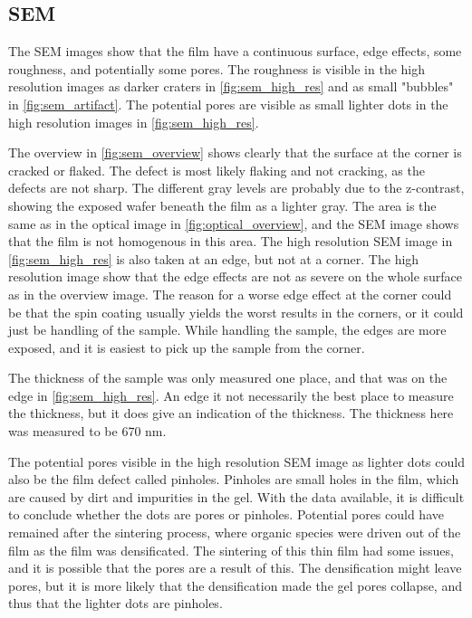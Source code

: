 \subsection{SEM}

\noindent The SEM images show that the film have a continuous surface, edge effects, some roughness, and potentially some pores.
The roughness is visible in the high resolution images as darker craters in \autoref{fig:sem_high_res} and as small "bubbles" in \autoref{fig:sem_artifact}.
The potential pores are visible as small lighter dots in the high resolution images in \autoref{fig:sem_high_res}.

The overview in \autoref{fig:sem_overview} shows clearly that the surface at the corner is cracked or flaked.
The defect is most likely flaking and not cracking, as the defects are not sharp.
The different gray levels are probably due to the z-contrast, showing the exposed wafer beneath the film as a lighter gray.
The area is the same as in the optical image in \autoref{fig:optical_overview}, and the SEM image shows that the film is not homogenous in this area.
The high resolution SEM image in \autoref{fig:sem_high_res} is also taken at an edge, but not at a corner.
The high resolution image show that the edge effects are not as severe on the whole surface as in the overview image.
The reason for a worse edge effect at the corner could be that the spin coating usually yields the worst results in the corners, or it could just be handling of the sample.
While handling the sample, the edges are more exposed, and it is easiest to pick up the sample from the corner.

The thickness of the sample was only measured one place, and that was on the edge in \autoref{fig:sem_high_res}.
An edge it not necessarily the best place to measure the thickness, but it does give an indication of the thickness.
The thickness here was measured to be 670 nm.


The potential pores visible in the high resolution SEM image as lighter dots could also be the film defect called pinholes.
Pinholes are small holes in the film, which are caused by dirt and impurities in the gel.
With the data available, it is difficult to conclude whether the dots are pores or pinholes.
Potential pores could have remained after the sintering process, where organic species were driven out of the film as the film was densificated.
The sintering of this thin film had some issues, and it is possible that the pores are a result of this.
The densification might leave pores, but it is more likely that the densification made the gel pores collapse, and thus that the lighter dots are pinholes.

